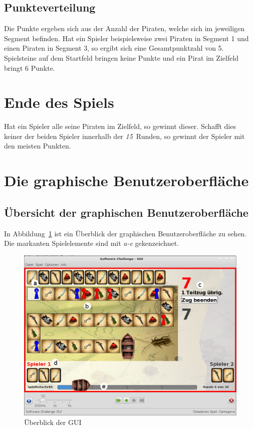 \documentclass[a4paper, ngerman]{scrartcl}
\newcommand{\RundenAnzahl}{\emph{15}}
\begin{document}
	\subsection{Punkteverteilung}
	Die Punkte ergeben sich aus der Anzahl der Piraten, welche sich im jeweiligen
	Segment befinden. Hat ein Spieler beispielsweise zwei Piraten in Segment 1 und
	einen Piraten in Segment 3, so ergibt sich eine Gesamtpunktzahl von 5.\\
	Spielsteine auf dem Startfeld bringen keine Punkte und ein Pirat im Zielfeld
	bringt 6 Punkte.
	
\section{Ende des Spiels}

	Hat ein Spieler alle seine Piraten im Zielfeld, so gewinnt dieser. Schafft dies
	keiner der beiden Spieler innerhalb der \RundenAnzahl\ Runden, so
	gewinnt der Spieler mit den meisten Punkten.
	
\section{Die graphische Benutzeroberfläche}
\subsection{Übersicht der graphischen Benutzeroberfläche}
	In Abbildung~\ref{fig:GUI} ist ein Überblick der graphischen Benutzeroberfläche
	zu sehen. Die markanten Spielelemente sind mit \emph{a-e} gekenzeichnet.
	
	 \begin{figure}[h!]
		\centering		
		\includegraphics[scale = 0.3]{bilder/gui}
		\caption{Überblick der GUI}
		\label{fig:GUI}
	\end{figure}
	
\end{document}
